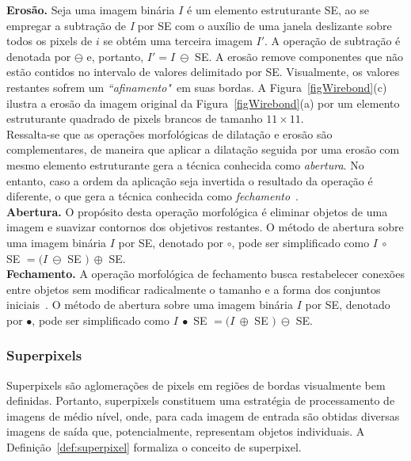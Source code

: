 \noindent
\textbf{Erosão.}
Seja uma imagem binária $I$ é um elemento estruturante SE, ao se empregar a subtração de \textit{I} por SE com o auxílio de uma janela deslizante sobre todos os pixels de $i$ se obtém uma terceira imagem $I'$.
A operação de subtração é denotada por $\ominus$ e, portanto, $I' = I ~\ominus$ SE.
A erosão remove componentes que não estão contidos no intervalo de valores delimitado por SE. 
Visualmente, os valores restantes sofrem um \textit{``afinamento"}~em suas bordas.
A Figura~\ref{figWirebond}(c) ilustra a erosão da imagem original da Figura~\ref{figWirebond}(a) por um elemento estruturante quadrado de pixels brancos de tamanho $11 \times 11$.\\

Ressalta-se que as operações morfológicas de dilatação e erosão são complementares, de maneira que aplicar a dilatação seguida por uma erosão com mesmo elemento estruturante gera a técnica conhecida como \textit{abertura}.
No entanto, caso a ordem da aplicação seja invertida o resultado da operação é diferente, o que gera a técnica conhecida como \textit{fechamento}~\cite{Sonka1993}.\\

\noindent
\textbf{Abertura.} 
O propósito desta operação morfológica é eliminar objetos de uma imagem e suavizar contornos dos objetivos restantes.
O método de abertura sobre uma imagem binária $I$ por SE, denotado por $\circ$, pode ser simplificado como
$I~\circ$ SE $ = (I~\ominus $ SE $)~\oplus$ SE.\\

\noindent
\textbf{Fechamento.}
A operação morfológica de fechamento busca restabelecer conexões entre objetos sem modificar radicalmente o tamanho e a forma dos conjuntos iniciais~\cite{Gil2002}.
O método de abertura sobre uma imagem binária $I$ por SE, denotado por $\bullet$, pode ser simplificado como
$I~\bullet$ SE $ = (I~\oplus $ SE $)~\ominus$ SE.

\subsubsection{Superpixels}

Superpixels são aglomerações de pixels em regiões de bordas visualmente bem definidas.
Portanto, superpixels constituem uma estratégia de processamento de imagens de médio nível, onde, para cada imagem de entrada são obtidas diversas imagens de saída que, potencialmente, representam objetos individuais.
A Definição~\ref{def:superpixel} formaliza o conceito de superpixel.


